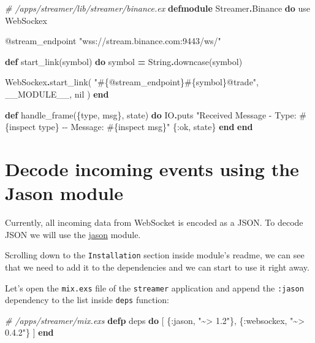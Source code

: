 \documentclass[
  oneside]{book}
\newenvironment{Shaded}{\begin{snugshade}}{\end{snugshade}}
\newcommand{\CommentTok}[1]{\textcolor[rgb]{0.56,0.35,0.01}{\textit{#1}}}
\newcommand{\ConstantTok}[1]{\textcolor[rgb]{0.00,0.00,0.00}{#1}}
\newcommand{\ImportTok}[1]{#1}
\newcommand{\KeywordTok}[1]{\textcolor[rgb]{0.13,0.29,0.53}{\textbf{#1}}}
\newcommand{\NormalTok}[1]{#1}
\newcommand{\OperatorTok}[1]{\textcolor[rgb]{0.81,0.36,0.00}{\textbf{#1}}}
\newcommand{\OtherTok}[1]{\textcolor[rgb]{0.56,0.35,0.01}{#1}}
\newcommand{\StringTok}[1]{\textcolor[rgb]{0.31,0.60,0.02}{#1}}
\newcommand{\VariableTok}[1]{\textcolor[rgb]{0.00,0.00,0.00}{#1}}
\begin{document}
\begin{Shaded}
\begin{Highlighting}[]
\CommentTok{\# /apps/streamer/lib/streamer/binance.ex}
\KeywordTok{defmodule} \ConstantTok{Streamer}\OperatorTok{.}\ConstantTok{Binance} \KeywordTok{do}
  \ImportTok{use} \ConstantTok{WebSockex}

  \OtherTok{@stream\_endpoint} \StringTok{"wss://stream.binance.com:9443/ws/"}

  \KeywordTok{def}\NormalTok{ start\_link(symbol) }\KeywordTok{do}
\NormalTok{    symbol }\OperatorTok{=} \ConstantTok{String}\OperatorTok{.}\NormalTok{downcase(symbol)}

    \ConstantTok{WebSockex}\OperatorTok{.}\NormalTok{start\_link(}
      \StringTok{"}\OtherTok{\#\{@stream\_endpoint\}\#\{}\NormalTok{symbol}\OtherTok{\}}\StringTok{@trade"}\NormalTok{,}
      \ConstantTok{\_\_MODULE\_\_}\NormalTok{,}
      \ConstantTok{nil}
\NormalTok{    )}
  \KeywordTok{end}

  \KeywordTok{def}\NormalTok{ handle\_frame(\{type, msg\}, state) }\KeywordTok{do}
    \ConstantTok{IO}\OperatorTok{.}\NormalTok{puts }\StringTok{"Received Message {-} Type: }\OtherTok{\#\{}\NormalTok{inspect type}\OtherTok{\}}\StringTok{ {-}{-} Message: }\OtherTok{\#\{}\NormalTok{inspect msg}\OtherTok{\}}\StringTok{"}
\NormalTok{    \{}\VariableTok{:ok}\NormalTok{, state\}}
  \KeywordTok{end}
\KeywordTok{end}
\end{Highlighting}
\end{Shaded}

\hypertarget{decode-incoming-events-using-the-jason-module}{%
\section{Decode incoming events using the Jason module}\label{decode-incoming-events-using-the-jason-module}}

Currently, all incoming data from WebSocket is encoded as a JSON. To decode JSON we will use the \href{https://github.com/michalmuskala/jason}{jason} module.

Scrolling down to the \texttt{Installation} section inside module's readme, we can see that we need to add it to the dependencies and we can start to use it right away.

Let's open the \texttt{mix.exs} file of the \texttt{streamer} application and append the \texttt{:jason} dependency to the list inside \texttt{deps} function:

\begin{Shaded}
\begin{Highlighting}[]
  \CommentTok{\# /apps/streamer/mix.exs}
  \KeywordTok{defp}\NormalTok{ deps }\KeywordTok{do}
\NormalTok{    [}
\NormalTok{      \{}\VariableTok{:jason}\NormalTok{, }\StringTok{"\textasciitilde{}\textgreater{} 1.2"}\NormalTok{\},}
\NormalTok{      \{}\VariableTok{:websockex}\NormalTok{, }\StringTok{"\textasciitilde{}\textgreater{} 0.4.2"}\NormalTok{\}}
\NormalTok{    ]}
  \KeywordTok{end}
\end{Highlighting}
\end{Shaded}
\end{document}
